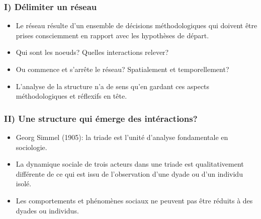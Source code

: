 \documentclass{beamer}
\begin{document}
\begin{frame}
    \frametitle{I) Délimiter un réseau}
    \begin{itemize}
        \item Le réseau résulte d'un ensemble de décisions méthodologiques qui doivent être prises consciemment en rapport avec les hypothèses de départ.
        \item Qui sont les noeuds? Quelles interactions relever?
        \item Ou commence et s'arrête le réseau? Spatialement et temporellement?
        \item L'analyse de la structure n'a de sens qu'en gardant ces aspects méthodologiques et réflexifs en tête.
    \end{itemize}
\end{frame}

\begin{frame}
    \frametitle{II) Une structure qui émerge des intéractions?}
    \begin{itemize}
        \item Georg Simmel (1905): la triade est l’unité
        d’analyse fondamentale en sociologie. 
        \item La dynamique sociale de trois acteurs dans une triade est qualitativement différente de ce qui est issu de l’observation d’une dyade ou d’un individu isolé.
        \item Les comportements et phénomènes sociaux ne peuvent pas être réduits à des dyades ou individus.
    \end{itemize}
\end{frame}
\end{document}
